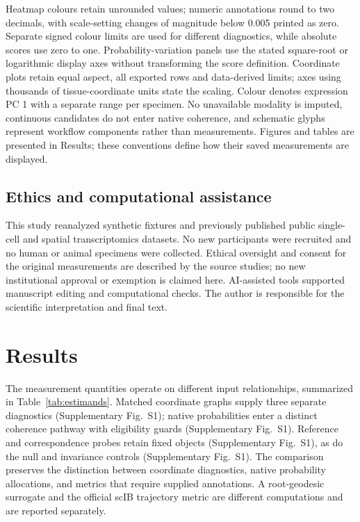 \documentclass[11pt]{article}
\begin{document}
Heatmap colours retain unrounded values; numeric annotations round to two decimals, with scale-setting changes of magnitude below 0.005 printed as zero. Separate signed colour limits are used for different diagnostics, while absolute scores use zero to one. Probability-variation panels use the stated square-root or logarithmic display axes without transforming the score definition. Coordinate plots retain equal aspect, all exported rows and data-derived limits; axes using thousands of tissue-coordinate units state the scaling. Colour denotes expression PC 1 with a separate range per specimen. No unavailable modality is imputed, continuous candidates do not enter native coherence, and schematic glyphs represent workflow components rather than measurements. Figures and tables are presented in Results; these conventions define how their saved measurements are displayed.



\subsection{Ethics and computational assistance}
This study reanalyzed synthetic fixtures and previously published public single-cell and spatial transcriptomics datasets. No new participants were recruited and no human or animal specimens were collected. Ethical oversight and consent for the original measurements are described by the source studies; no new institutional approval or exemption is claimed here.
AI-assisted tools supported manuscript editing and computational checks. The author is responsible for the scientific interpretation and final text.

\section{Results}

The measurement quantities operate on different input relationships, summarized in Table~\ref{tab:estimands}. Matched coordinate graphs supply three separate diagnostics (Supplementary Fig.~S1); native probabilities enter a distinct coherence pathway with eligibility guards (Supplementary Fig.~S1). Reference and correspondence probes retain fixed objects (Supplementary Fig.~S1), as do the null and invariance controls (Supplementary Fig.~S1). The comparison preserves the distinction between coordinate diagnostics, native probability allocations, and metrics that require supplied annotations. A root-geodesic surrogate and the official scIB trajectory metric are different computations and are reported separately.
\end{document}
